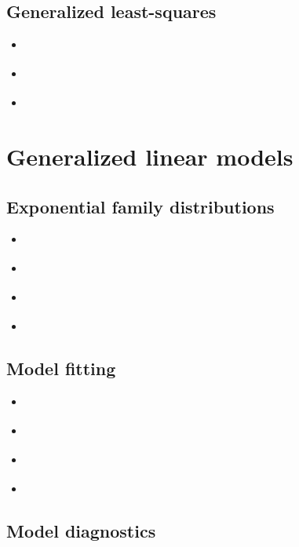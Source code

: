 \documentclass{report}
\begin{document}
\subsection{Generalized least-squares}

\begin{itemize}
    \item \cite[Chapter~8.1]{faraway_linear_2015}
    \item \cite[Chapter~2.7.2]{agresti_foundations_2015}
    \item \cite[Chapter~5.6.2]{wakefield_bayesian_2013}
\end{itemize}

\section{Generalized linear models}\label{sec:reading-glm}

\subsection{Exponential family distributions}

\begin{itemize}
    \item \cite[Chapter~3.2]{dobson_introduction_2018}
    \item \cite[Chapter~8.1]{faraway_extending_2016}
    \item \cite[Chapter~4.1]{agresti_foundations_2015}
    \item \cite[Chapter~2.3]{hardin_generalized_2018}
\end{itemize}

\subsection{Model fitting}

\begin{itemize}
    \item \cite[Chapter~8.2]{faraway_extending_2016}
    \item \cite[Chapter~2]{dobson_introduction_2018}
    \item \cite[Chapter~4.5]{agresti_foundations_2015}
    \item \cite[Chapter~3]{hardin_generalized_2018}
\end{itemize}

\subsection{Model diagnostics}
\end{document}
